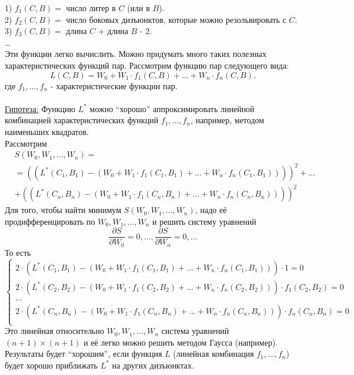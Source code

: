 \documentclass{article}
\numberwithin{example}{section}
\numberwithin{question}{section}
\numberwithin{Remark}{section}
\numberwithin{theorem}{section}
\numberwithin{definition}{section}
\numberwithin{proposition}{section}
\begin{document}
1) $f_1(C,B)=$ число литер в $C$ (или в $B$).\\
2) $f_2(C,B)=$ число боковых дизъюнктов, которые можно резольвировать с $C$.\\
3) $f_3(C,B)=$ длина $C$ + длина $B$ - 2.\\
\ldots\\
Эти функции легко вычислить. Можно придумать много таких полезных характеристических функций пар. Рассмотрим функцию пар следующего вида:
\begin{equation*}
L(C,B)=W_0+W_1\cdot f_1(C,B)+\ldots+W_n\cdot f_n(C,B).
\end{equation*}
где $f_1,\ldots,f_n$ - характеристические функции пар.\\
\\
\underline{Гипотеза:} Функцию $L^*$ можно ``хорошо'' аппроксимировать линейной комбинацией характеристических функций $f_1,\ldots,f_n$, например, методом наименьших квадратов.\\
Рассмотрим
\begin{equation*}
\begin{aligned}
&S(W_0,W_1,\ldots,W_n)=\\
&=\left( (L^*(C_1,B_1)-(W_0+W_1\cdot f_1(C_1,B_1)+\ldots+W_n\cdot f_n(C_1,B_1)))\right)^2+\ldots\\
&+\left( (L^*(C_n,B_n)-(W_0+W_1\cdot f_1(C_n,B_n)+\ldots+W_n\cdot f_n(C_n,B_n)))\right)^2
\end{aligned}
\end{equation*}
Для того, чтобы найти минимум $S(W_0,W_1,\ldots,W_n)$, надо её продифференцировать по $W_0,W_1,\ldots,W_n$ и решить систему уравнений 
\begin{equation*}
\frac{\partial S}{\partial W_0}=0,\ldots,\frac{\partial S}{\partial W_n}=0,\ldots
\end{equation*}
То есть
\begin{equation*}
\left\{
\begin{array}{l}
2\cdot (L^*(C_1,B_1)-(W_0+W_1\cdot f_1(C_1,B_1)+\ldots+W_n\cdot f_n(C_1,B_1)))\cdot 1=0\\
2\cdot (L^*(C_2,B_2)-(W_0+W_1\cdot f_1(C_2,B_2)+\ldots+W_n\cdot f_n(C_2,B_2)))\cdot f_1(C_2,B_2)=0\\
\ldots\\
2\cdot (L^*(C_n,B_n)-(W_0+W_1\cdot f_1(C_n,B_n)+\ldots+W_n\cdot f_n(C_n,B_n)))\cdot f_n(C_n,B_n)=0\\
\end{array}\right.
\end{equation*}
Это линейная относительно $W_0,W_1,\ldots,W_n$ система уравнений $(n+1)\times(n+1)$ и её легко можно решить методом Гаусса (например).\\
Результаты будет ``хорошим'', если функция $L$ (линейная комбинация $f_1,\ldots,f_n$) будет хорошо приближать $L^*$ на других дизъюнктах.
\end{document}
